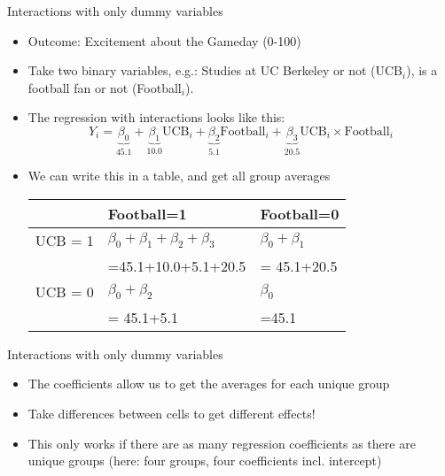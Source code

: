 \documentclass[11pt]{beamer}
\begin{document}
\begin{frame}{Interactions with only dummy variables}
\begin{itemize}
    \item Outcome: Excitement about the  Gameday (0-100)
    \item Take two binary variables, e.g.: Studies at UC Berkeley or not (UCB$_i$), is a football fan or not (Football$_i$). 
    \item The regression with interactions looks like this:
$$
Y_i = \underbrace{\beta_0}_{45.1} + \underbrace{\beta_1}_{10.0}\text{UCB}_i + \underbrace{\beta_2}_{5.1}\text{Football}_i + \underbrace{\beta_3}_{20.5}\text{UCB}_i \times \text{Football}_i
$$
\item We can write this in a table, and get all group averages
\vspace{0.25cm}
    \begin{table}[]
\begin{tabular}{lll}
\toprule
                      & Football=1                                                & Football=0            \\ \midrule
UCB = 1           & $\beta_0 + \beta_1 + \beta_2 + \beta_3$ & $\beta_0 + \beta_1$  \\
& =45.1+10.0+5.1+20.5 &  = 45.1+20.5 \\
UCB = 0  & $\beta_0 + \beta_2$                            & $\beta_0$                  \\
& = 45.1+5.1 & =45.1 \\
\bottomrule
\end{tabular}
\end{table}

\end{itemize}

\end{frame}


\begin{frame}{Interactions with only dummy variables}
\vspace{0.25cm}
\begin{itemize}
\item The coefficients allow us to get the averages for each unique group 
\item Take differences between cells to get different effects!
\item This only works if there are as many regression coefficients as there are unique groups (here: four groups, four coefficients incl. intercept)
\end{itemize}

\end{frame}
\end{document}

